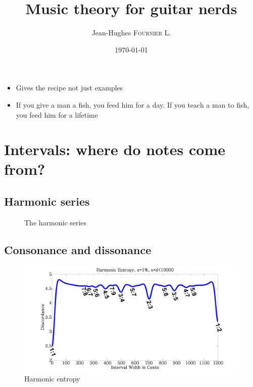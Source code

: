 \documentclass{article}
\title{ Music theory for guitar nerds  } %
\author{ Jean-Hughes \textsc{Fournier L.} } %
\date{\today} %
\begin{document}
\maketitle %
\newpage
\tableofcontents
\newpage

\begin{itemize}
	\item Gives the recipe not just examples
	\item If you give a man a fish, you feed him for a day. If you teach a man to fish, you feed him for a lifetime
\end{itemize}

\section{Intervals: where do notes come from?}


\subsection{Harmonic series}

\begin{figure}[h!]
	\centering
	\scalebox{1}{}
	\caption{The harmonic series}
	\label{fig:serie_harmonique}
\end{figure} 







\subsection{Consonance and dissonance}

\begin{figure}[h!]
	\centering
	\hspace*{0cm}
	\includegraphics[scale=0.03, trim= {0cm 0cm 0cm 0cm}, clip]{Harmonic_entropy.png}
	\caption{Harmonic entropy}
	\label{fig}
\end{figure}
\end{document}
